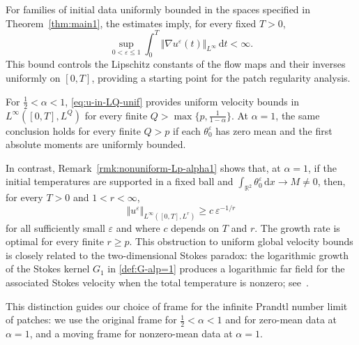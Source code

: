 \documentclass[reqno,11pt,a4paper]{amsart}
\newcommand{\dd}{\mathrm{d}}
\begin{document}
For families of initial data uniformly bounded in the spaces
specified in Theorem~\ref{thm:main1}, the estimates imply,
for every fixed $T>0$,
\[
  \sup_{0<\varepsilon\leq1}
  \int_0^T
  \Vert \nabla u^\varepsilon(t)\Vert _{L^\infty}\,\dd t
  <\infty.
\]
This bound controls the Lipschitz constants of the flow maps
and their inverses uniformly on $[0,T]$,
providing a starting point for the patch regularity analysis.

For $\frac12<\alpha<1$, \eqref{eq:u-in-LQ-unif}
provides uniform velocity bounds in
$L^\infty([0,T],L^Q)$
for every finite $Q>\max\{p,\frac1{1-\alpha}\}$.
At $\alpha=1$, the same conclusion holds for every finite
$Q>p$ if each $\theta_0^\varepsilon$ has zero mean
and the first absolute moments are uniformly bounded.

In contrast, Remark~\ref{rmk:nonuniform-Lp-alpha1}
shows that, at $\alpha=1$, if the initial temperatures
are supported
in a fixed ball and
$\int_{\mathbb R^2}\theta_0^\varepsilon\,\dd x\to M\ne0$,
then, for every $T>0$ and $1<r<\infty$,
\[
  \Vert u^\varepsilon\Vert _{L^\infty([0,T],L^r)}
  \geq c \ \varepsilon^{-1/r}
\]
for all sufficiently small $\varepsilon$ and where $c$ depends on $T$ and $r$.
The growth rate is optimal for every finite $r\geq p$.
This obstruction to uniform global velocity bounds
is closely related to the two-dimensional Stokes paradox:
the logarithmic growth of the Stokes kernel $G_1$
in \eqref{def:G-alp=1} produces a logarithmic far field
for the associated Stokes velocity when the total
temperature is nonzero;
see~\cite[Chapter~V]{Galdi11}.



This distinction guides our choice of frame
for the infinite Prandtl number limit of patches:
we use the original frame for $\frac12<\alpha<1$
and for zero-mean data at $\alpha=1$,
and a moving frame for nonzero-mean data at $\alpha=1$.


\end{document}
